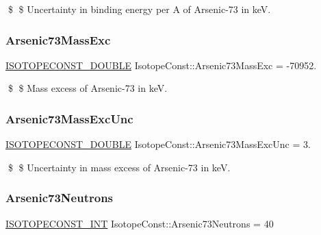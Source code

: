 \$ \$ Uncertainty in binding energy per A of Arsenic-\/73 in keV. \mbox{\label{group___isotope_const-_arsenic-_as73_ga1c1323ba0b13fc2749388f4b99bac4ce}} 
\subsubsection{\texorpdfstring{Arsenic73\+Mass\+Exc}{Arsenic73MassExc}}
{\footnotesize\ttfamily \mbox{\hyperlink{group___isotope_const-_macros_ga8f45a7272ce02c0b4c65c44636ed719a}{I\+S\+O\+T\+O\+P\+E\+C\+O\+N\+S\+T\+\_\+\+D\+O\+U\+B\+LE}} Isotope\+Const\+::\+Arsenic73\+Mass\+Exc = -\/70952.}

\$ \$ Mass excess of Arsenic-\/73 in keV. \mbox{\label{group___isotope_const-_arsenic-_as73_ga7a2cdcb604f7817bfcba2ab16775df4e}} 
\subsubsection{\texorpdfstring{Arsenic73\+Mass\+Exc\+Unc}{Arsenic73MassExcUnc}}
{\footnotesize\ttfamily \mbox{\hyperlink{group___isotope_const-_macros_ga8f45a7272ce02c0b4c65c44636ed719a}{I\+S\+O\+T\+O\+P\+E\+C\+O\+N\+S\+T\+\_\+\+D\+O\+U\+B\+LE}} Isotope\+Const\+::\+Arsenic73\+Mass\+Exc\+Unc = 3.}

\$ \$ Uncertainty in mass excess of Arsenic-\/73 in keV. \mbox{\label{group___isotope_const-_arsenic-_as73_gaddc31edf77b6f5d9ad7cc06d0a76fdce}} 
\subsubsection{\texorpdfstring{Arsenic73\+Neutrons}{Arsenic73Neutrons}}
{\footnotesize\ttfamily \mbox{\hyperlink{group___isotope_const-_macros_ga5f18360b3e99483a35c32d789e62621c}{I\+S\+O\+T\+O\+P\+E\+C\+O\+N\+S\+T\+\_\+\+I\+NT}} Isotope\+Const\+::\+Arsenic73\+Neutrons = 40}

